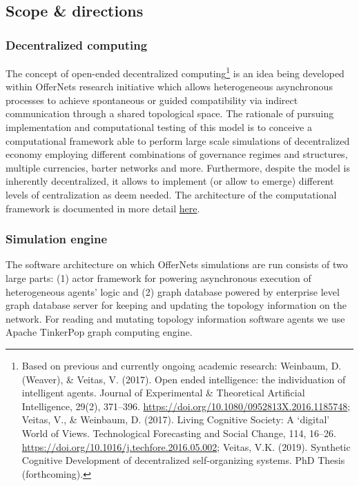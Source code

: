 \documentclass[]{article}
\let\rmarkdownfootnote\footnote%
\def\footnote{\protect\rmarkdownfootnote}
\begin{document}
\hypertarget{scope-directions}{%
\subsection{Scope \& directions}\label{scope-directions}}

\hypertarget{decentralized-computing}{%
\subsubsection{Decentralized computing}\label{decentralized-computing}}

The concept of open-ended decentralized computing\footnote{Based on
  previous and currently ongoing academic research: Weinbaum, D.
  (Weaver), \& Veitas, V. (2017). Open ended intelligence: the
  individuation of intelligent agents. Journal of Experimental \&
  Theoretical Artificial Intelligence, 29(2), 371--396.
  \url{https://doi.org/10.1080/0952813X.2016.1185748}; Veitas, V., \&
  Weinbaum, D. (2017). Living Cognitive Society: A `digital' World of
  Views. Technological Forecasting and Social Change, 114, 16--26.
  \url{https://doi.org/10.1016/j.techfore.2016.05.002}; Veitas, V.K.
  (2019). Synthetic Cognitive Development of decentralized
  self-organizing systems. PhD Thesis (forthcoming).} is an idea being
developed within OfferNets research initiative which allows
heterogeneous asynchronous processes to achieve spontaneous or guided
compatibility via indirect communication through a shared topological
space. The rationale of pursuing implementation and computational
testing of this model is to conceive a computational framework able to
perform large scale simulations of decentralized economy employing
different combinations of governance regimes and structures, multiple
currencies, barter networks and more. Furthermore, despite the model is
inherently decentralized, it allows to implement (or allow to emerge)
different levels of centralization as deem needed. The architecture of
the computational framework is documented in more detail
\href{https://singnet.github.io/offernet/public/offernet-documentation/conceptual-framework.html\#conceptual-architecture}{here}.

\hypertarget{simulation-engine}{%
\subsubsection{Simulation engine}\label{simulation-engine}}

The software architecture on which OfferNets simulations are run
consists of two large parts: (1) actor framework for powering
asynchronous execution of heterogeneous agents' logic and (2) graph
database powered by enterprise level graph database server for keeping
and updating the topology information on the network. For reading and
mutating topology information software agents we use Apache TinkerPop
graph computing engine.
\end{document}
